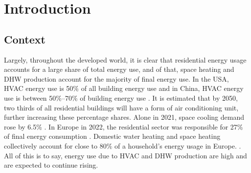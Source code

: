 \chapter{Introduction}\label{ch:intro}



\section{Context}\label{sec:context}

Largely, throughout the developed world, it is clear that residential energy usage accounts for a large share of total energy use, and of that, space heating and \ac{DHW} production account for the majority of final energy use. In the USA, \ac{HVAC} energy use is 50\% of all building energy use and in China, \ac{HVAC} energy use is between 50\%--70\% of building energy use \cite{ieaorg_2018}. It is estimated that by 2050, two thirds of all residential buildings will have a form of air conditioning unit, further increasing these percentage shares. Alone in 2021, space cooling demand rose by 6.5\% \cite{ieaorg_2022}. 
In Europe in 2022, the  residential sector was responsible for 27\% of final energy consumption \cite{eurostat_final_2018}. Domestic water heating and space heating collectively account for close to 80\% of a household's energy usage in Europe. \cite{eurostat_energy_2020}.
All of this is to say, energy use due to \ac{HVAC} and \ac{DHW} production are high and are expected to continue rising. 


